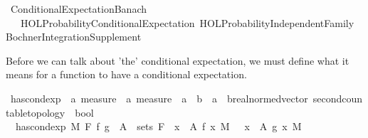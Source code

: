 %
\begin{isabellebody}%
%
%
\isadelimtheory
\isanewline
\isanewline
%
\endisadelimtheory
%
\isatagtheory
{}\isamarkupfalse%
\ Conditional{\isacharunderscore}{\kern0pt}Expectation{\isacharunderscore}{\kern0pt}Banach\isanewline
\ \ \ {\isachardoublequoteopen}HOL{\isacharminus}{\kern0pt}Probability{\isachardot}{\kern0pt}Conditional{\isacharunderscore}{\kern0pt}Expectation{\isachardoublequoteclose}\ {\isachardoublequoteopen}HOL{\isacharminus}{\kern0pt}Probability{\isachardot}{\kern0pt}Independent{\isacharunderscore}{\kern0pt}Family{\isachardoublequoteclose}\ Bochner{\isacharunderscore}{\kern0pt}Integration{\isacharunderscore}{\kern0pt}Supplement\isanewline
{}%
\endisatagtheory
{\isafoldtheory}%
%
\isadelimtheory
%
\endisadelimtheory
%
\isadelimdocument
%
\endisadelimdocument
%
\isatagdocument
%
\isamarkuptrue%
%
\endisatagdocument
{\isafolddocument}%
%
\isadelimdocument
%
\endisadelimdocument
%
\begin{isamarkuptext}%
Before we can talk about 'the' conditional expectation, we must define what it means for a function to have a conditional expectation.%
\end{isamarkuptext}\isamarkuptrue%
\isamarkupfalse%
\ has{\isacharunderscore}{\kern0pt}cond{\isacharunderscore}{\kern0pt}exp\ {\isacharcolon}{\kern0pt}{\isacharcolon}{\kern0pt}\ {\isachardoublequoteopen}{\isacharprime}{\kern0pt}a\ measure\ {\isasymRightarrow}\ {\isacharprime}{\kern0pt}a\ measure\ {\isasymRightarrow}\ {\isacharparenleft}{\kern0pt}{\isacharprime}{\kern0pt}a\ {\isasymRightarrow}\ {\isacharprime}{\kern0pt}b{\isacharparenright}{\kern0pt}\ {\isasymRightarrow}\ {\isacharparenleft}{\kern0pt}{\isacharprime}{\kern0pt}a\ {\isasymRightarrow}\ {\isacharprime}{\kern0pt}b{\isacharcolon}{\kern0pt}{\isacharcolon}{\kern0pt}{\isacharbraceleft}{\kern0pt}real{\isacharunderscore}{\kern0pt}normed{\isacharunderscore}{\kern0pt}vector{\isacharcomma}{\kern0pt}\ second{\isacharunderscore}{\kern0pt}countable{\isacharunderscore}{\kern0pt}topology{\isacharbraceright}{\kern0pt}{\isacharparenright}{\kern0pt}\ {\isasymRightarrow}\ bool{\isachardoublequoteclose}\ \ \isanewline
\ \ {\isachardoublequoteopen}has{\isacharunderscore}{\kern0pt}cond{\isacharunderscore}{\kern0pt}exp\ M\ F\ f\ g\ {\isacharequal}{\kern0pt}\ {\isacharparenleft}{\kern0pt}{\isacharparenleft}{\kern0pt}{\isasymforall}A\ {\isasymin}\ sets\ F{\isachardot}{\kern0pt}\ {\isacharparenleft}{\kern0pt}{\isasymintegral}\ x\ {\isasymin}\ A{\isachardot}{\kern0pt}\ f\ x\ {\isasympartial}M{\isacharparenright}{\kern0pt}\ {\isacharequal}{\kern0pt}\ {\isacharparenleft}{\kern0pt}{\isasymintegral}\ x\ {\isasymin}\ A{\isachardot}{\kern0pt}\ g\ x\ {\isasympartial}M{\isacharparenright}{\kern0pt}{\isacharparenright}{\kern0pt}\isanewline

\end{isabellebody}
